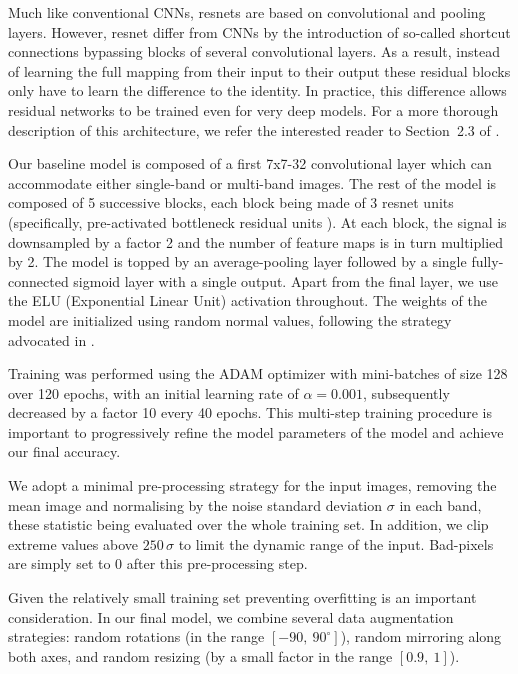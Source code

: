 \documentclass[useAMS,usenatbib]{mnras}
\begin{document}
Much like conventional CNNs, resnets are based on convolutional and pooling layers. However, resnet differ from CNNs by the introduction of so-called shortcut connections bypassing blocks of several convolutional layers. As a result, instead of learning the full mapping from their input to their output these residual blocks only have to  learn the difference to the identity. In practice, this difference allows residual networks to be trained even for very deep models. For a more thorough description of this architecture, we refer the interested reader to Section~2.3 of \citet{Lanusse2017}.

Our baseline model is composed of a first 7x7-32 convolutional layer which can accommodate either single-band or multi-band images. The rest of the model is composed of 5 successive blocks, each block being made of 3 resnet units (specifically, pre-activated bottleneck residual units \citep{He2016}). At each block, the signal is downsampled by a factor 2 and the number of feature maps is in turn multiplied by 2. The model is topped by an average-pooling layer followed by a single fully-connected sigmoid layer with a single output. Apart from the final layer, we use the ELU (Exponential Linear Unit) activation throughout. The weights of the model are initialized using random normal values, following the strategy advocated in \citet{He2015a}. 

Training was performed using the ADAM optimizer with mini-batches of size 128 over 120 epochs, with an initial learning rate of $\alpha=0.001$, subsequently decreased by a factor 10 every 40 epochs. This multi-step training procedure is important to progressively refine the model parameters of the model and achieve our final accuracy.

We adopt a minimal pre-processing strategy for the input images, removing the mean image and normalising by the noise standard deviation $\sigma$ in each band, these statistic being evaluated over the whole training set. In addition, we clip extreme values above $250 \,\sigma$ to limit the dynamic range of the input. Bad-pixels are simply set to 0 after this pre-processing step.

Given the relatively small training set preventing overfitting is an important consideration. In our final model, we combine several data augmentation strategies: random rotations (in the range $[-90, \ 90^\circ]$), random mirroring along both axes, and random resizing (by a small factor in the range $[0.9, \ 1]$).
\end{document}
